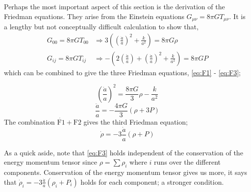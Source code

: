 Perhaps the most important aspect of this section is the derivation of the Friedman equations. They arise from the Einstein equations $G_{\mu \nu} = 8\pi G T_{\mu \nu}$. It is a lengthy but not conceptually difficult calculation to show that,
\begin{align}
G_{00} = 8\pi G T_{00} &\Longrightarrow 3\left( \left(\frac{\dot{a}}{a}\right)^2 + \frac{k}{a^2} \right) = 8\pi G \rho \\
G_{ij} = 8\pi G T_{ij} &\Longrightarrow -\left(2\left(\frac{\ddot{a}}{a}\right) + \left(\frac{\dot{a}}{a}\right)^2 + \frac{k}{a^2}\right) = 8\pi G P
\end{align}
which can be combined to give the three Friedman equations, \eqref{eq:F1} - \eqref{eq:F3}; 
\begin{definitionbox}
\begin{equation}
\label{eq:F1}
\left(\frac{\dot{a}}{a}\right)^2 = \frac{8\pi G}{3} \rho - \frac{k}{a^2} \tag{F1}
\end{equation}
\begin{equation} 
\label{eq:F2}
\frac{\ddot{a}}{a} = - \frac{4\pi G}{3} (\rho + 3P) \tag{F2}
\end{equation}
The combination $\dot{\text{F}1} + \text{F}2$ gives the third Friedman equation;
\begin{equation}
\label{eq:F3}
\dot{\rho} = -3 \frac{\dot{a}}{a} (\rho + P) \tag{F3}
\end{equation}
\end{definitionbox}
As a quick aside, note that \eqref{eq:F3} holds independent of the conservation of the energy momentum tensor since $\rho = \sum{\rho_i}$ where $i$ runs over the different components. Conservation of the energy momentum tensor gives us more, it says that $\dot{\rho}_i = -3\tfrac{\dot{a}}{a}(\rho_i + P_i)$ holds for each component; a stronger condition. 

